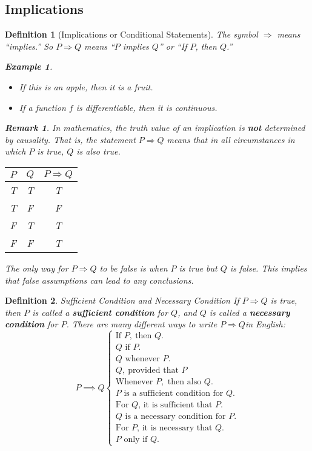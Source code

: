 \documentclass[12pt,a4paper]{article}
\newtheorem{df}{Definition}[subsection]
\newtheorem{eg}{Example}[subsection]
\newtheorem*{rmk}{\indent Remark}
\def\Q{{\mathbb{Q}}}
\def\P{{\mathcal{P}}}
\begin{document}
\subsection{Implications}
\begin{df}[Implications or Conditional Statements]
	The symbol $\Rightarrow$ means ``implies.'' So $P\Rightarrow Q$ means ``$P$ implies $Q$'' or ``If $P$, then $Q$.''
	\begin{eg}
		\begin{itemize}
			\item If this is an apple, then it is a fruit.
			\item If a function $f$ is differentiable, then it is continuous.
		\end{itemize}	
	\end{eg}
	\begin{rmk}
		In mathematics, the truth value of an implication is \textbf{not} determined by causality. That is, the statement $P\Rightarrow Q$ means that in all circumstances in which $P$ is true, $Q$ is also true.
		\begin{center}\begin{tabular}{c|c|c}
			$P$&$Q$&$P\Rightarrow Q$\\
			\hline
			T&T&T\\
			T&F&F\\
			F&T&T\\
			F&F&T
		\end{tabular}\end{center}
		The only way for $P\Rightarrow Q$ to be false is when $P$ is true but $Q$ is false. This implies that false assumptions can lead to any conclusions. 
	\end{rmk}
\end{df}
\begin{df}{Sufficient Condition and Necessary Condition}
	If $P\Rightarrow Q$ is true, then $P$ is called a \textbf{sufficient condition} for $Q$, and $Q$ is called a \textbf{necessary condition} for $P$. There are many different ways to write $P\Rightarrow Q$in English: 
	\[P\implies Q\begin{cases}\text{If }P,\ \text{then }Q.\\Q\text{ if }P.\\Q\text{ whenever }P.\\Q,\ \text{provided that }P\\\text{Whenever }P,\text{ then also }Q.\\P\text{ is a sufficient condition for }Q.\\\text{For }Q\text{, it is sufficient that }P.\\Q\text{ is a necessary condition for }P.\\\text{For }P\text{, it is necessary that }Q.\\P\text{ only if }Q.\end{cases}\]	
\end{df}
\end{document}
